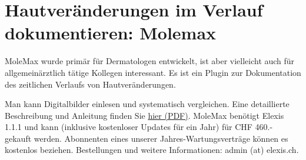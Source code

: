 \section{Hautveränderungen im Verlauf dokumentieren: Molemax} \label{Molemax} %
MoleMax wurde primär für Dermatologen entwickelt, ist aber vielleicht auch für allgemeinärztlich tätige Kollegen interessant. Es ist ein Plugin zur Dokumentation des zeitlichen Verlaufs von Hautveränderungen. 

 Man kann Digitalbilder einlesen und systematisch vergleichen. Eine detaillierte Beschreibung und Anleitung finden Sie \href{http://www.rgw.ch/elexis/dox/molemax.pdf}{hier (PDF)}.
MoleMax benötigt Elexis 1.1.1 und kann (inklusive kostenloser Updates für ein Jahr) für CHF 460.- gekauft werden. Abonnenten eines unserer Jahres-Wartungsverträge können es kostenlos beziehen. Bestellungen und weitere Informationen: admin (at) elexis.ch.